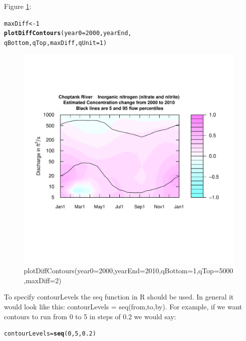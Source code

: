 \documentclass[a4paper,11pt]{article}\usepackage{graphicx, color}
\makeatletter
\newcommand{\hlfunctioncall}[1]{\textcolor[rgb]{0.501960784313725,0,0.329411764705882}{\textbf{#1}}}%
\newenvironment{kframe}{%
 \def\at@end@of@kframe{}%
 \ifinner\ifhmode%
  \def\at@end@of@kframe{\end{minipage}}%
  \begin{minipage}{\columnwidth}%
 \fi\fi%
 \def\FrameCommand##1{\hskip\@totalleftmargin \hskip-\fboxsep
 \colorbox{shadecolor}{##1}\hskip-\fboxsep
     \hskip-\linewidth \hskip-\@totalleftmargin \hskip\columnwidth}%
 \MakeFramed {\advance\hsize-\width
   \@totalleftmargin\z@ \linewidth\hsize
   \@setminipage}}%
 {\par\unskip\endMakeFramed%
 \at@end@of@kframe}
\newenvironment{knitrout}{}{} %
\makeatother
\begin{document}
Figure \ref{fig:plotDiffContours}:
\begin{knitrout}
\color{fgcolor}\begin{kframe}
\begin{alltt}
maxDiff<-1
\hlfunctioncall{plotDiffContours}(year0=2000,yearEnd,
                 qBottom,qTop,maxDiff,qUnit=1)
\end{alltt}
\end{kframe}\begin{figure}[]

\includegraphics[width=1\linewidth,height=1\linewidth]{figure/plotDiffContours} \caption[plotDiffContours(year0=2000,yearEnd=2010,qBottom=1,qTop=5000,maxDiff=2)]{plotDiffContours(year0=2000,yearEnd=2010,qBottom=1,qTop=5000,maxDiff=2)\label{fig:plotDiffContours}}
\end{figure}


\end{knitrout}



To specify contourLevels the seq function in R should be used.  In general it would look like this: contourLevels = seq(from,to,by).  For example, if we want contours to run from 0 to 5 in steps of 0.2 we would say:  

\begin{knitrout}
\color{fgcolor}\begin{kframe}
\begin{alltt}
contourLevels = \hlfunctioncall{seq}(0,5,0.2)
\end{alltt}
\end{kframe}
\end{knitrout}
\end{document}

